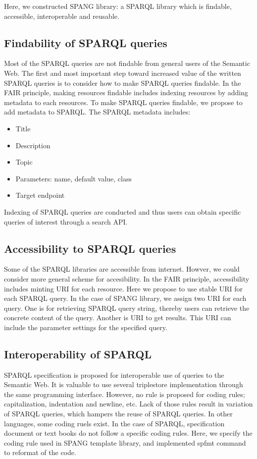 \documentclass[runningheads]{llncs}
\begin{document}
Here, we constructed SPANG library: a SPARQL library which is findable, accessible, interoperable and reusable.

\subsection{Findability of SPARQL queries}
Most of the SPARQL queries are not findable from general users of the Semantic Web. The first and most important step toward increased value of the written SPARQL queries is to consider how to make SPARQL queries findable.
In the FAIR principle, making resources findable includes indexing resources by adding metadata to each resources. 
To make SPARQL queries findable, we propose to add metadata to SPARQL.
The SPARQL metadata includes:
\begin{itemize}
    \item Title
    \item Description
    \item Topic
    \item Parameters: name, default value, class
    \item Target endpoint
\end{itemize}

Indexing of SPARQL queries are conducted and thus users can obtain specific queries of interest through a search API.

\subsection{Accessibility to SPARQL queries}
Some of the SPARQL libraries are accessible from internet. Howver, we could consider more general scheme for accesibility. In the FAIR principle, accessibility includes minting URI for each resource. Here we propose to use stable URI for each SPARQL query.
In the case of SPANG library, we assign two URI for each query. One is for retrieving SPARQL query string, thereby users can retrieve the concrete content of the query. Another is URI to get results. This URI can include the parameter settings for the specified query.

\subsection{Interoperability of SPARQL}
SPARQL specification is proposed for interoperable use of queries to the Semantic Web. It is valuable to use several triplestore implementation through the same programming interface. However, no rule is proposed for coding rules; capitalization, indentation and newline, etc. Lack of those rules result in variation of SPARQL queries, which hampers the reuse of SPARQL queries. In other languages, some coding ruels exist. In the case of SPARQL, specification document or text books do not follow a specific coding rules. Here, we specify the coding rule used in SPANG template library, and implemented spfmt command to reformat of the code.
\end{document}
